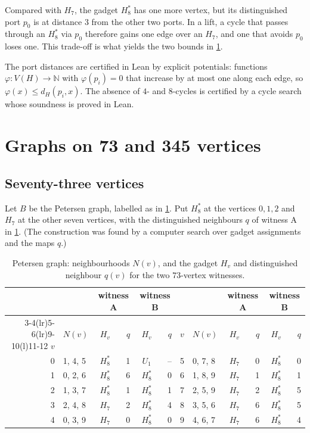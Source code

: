 \documentclass[11pt]{amsart}
\theoremstyle{definition}
\theoremstyle{remark}
\newcommand{\Hseven}{H_7}
\newcommand{\Height}{H_8^{*}}
\begin{document}
Compared with $\Hseven$, the gadget $\Height$ has one more vertex, but its
distinguished port $p_0$ is at distance $3$ from the other two ports. In a lift,
a cycle that passes through an $\Height$ via $p_0$ therefore gains one edge
over an $\Hseven$, and one that avoids $p_0$ loses one. This trade-off is what
yields the two bounds in \cref{sec:small}.

The port distances are certified in Lean by explicit potentials: functions
$\varphi\colon V(H)\to\mathbb{N}$ with $\varphi(p_i)=0$ that increase by at most
one along each edge, so $\varphi(x)\le d_H(p_i,x)$. The absence of $4$- and
$8$-cycles is certified by a cycle search whose soundness is proved in Lean.

\section{Graphs on 73 and 345 vertices}\label{sec:small}

\subsection{Seventy-three vertices}
Let $B$ be the Petersen graph, labelled as in \cref{tab:petersen}. Put
$\Height$ at the vertices $0,1,2$ and $\Hseven$ at the other seven vertices,
with the distinguished neighbours $q$ of witness A in \cref{tab:petersen}. (The
construction was found by a computer search over gadget assignments and the
maps $q$.)

\begin{table}[ht]
\centering
\caption{Petersen graph: neighbourhoods $N(v)$, and the gadget $H_v$ and
distinguished neighbour $q(v)$ for the two $73$-vertex witnesses.}
\label{tab:petersen}
\small
\begin{tabular}{@{}rlcrcr@{\hspace{2.5em}}rlcrcr@{}}
\toprule
& & \multicolumn{2}{c}{witness A} & \multicolumn{2}{c}{witness B} & & & \multicolumn{2}{c}{witness A} & \multicolumn{2}{c}{witness B}\\
\cmidrule(lr){3-4}\cmidrule(lr){5-6}\cmidrule(lr){9-10}\cmidrule(l){11-12}
$v$ & $N(v)$ & $H_v$ & $q$ & $H_v$ & $q$ & $v$ & $N(v)$ & $H_v$ & $q$ & $H_v$ & $q$\\
\midrule
0 & 1, 4, 5 & $\Height$ & 1 & $U_1$ & -- & 5 & 0, 7, 8 & $\Hseven$ & 0 & $\Height$ & 0\\
1 & 0, 2, 6 & $\Height$ & 6 & $\Height$ & 0 & 6 & 1, 8, 9 & $\Hseven$ & 1 & $\Height$ & 1\\
2 & 1, 3, 7 & $\Height$ & 1 & $\Height$ & 1 & 7 & 2, 5, 9 & $\Hseven$ & 2 & $\Height$ & 5\\
3 & 2, 4, 8 & $\Hseven$ & 2 & $\Height$ & 4 & 8 & 3, 5, 6 & $\Hseven$ & 6 & $\Height$ & 5\\
4 & 0, 3, 9 & $\Hseven$ & 0 & $\Height$ & 0 & 9 & 4, 6, 7 & $\Hseven$ & 6 & $\Height$ & 4\\
\bottomrule
\end{tabular}
\end{table}
\end{document}
